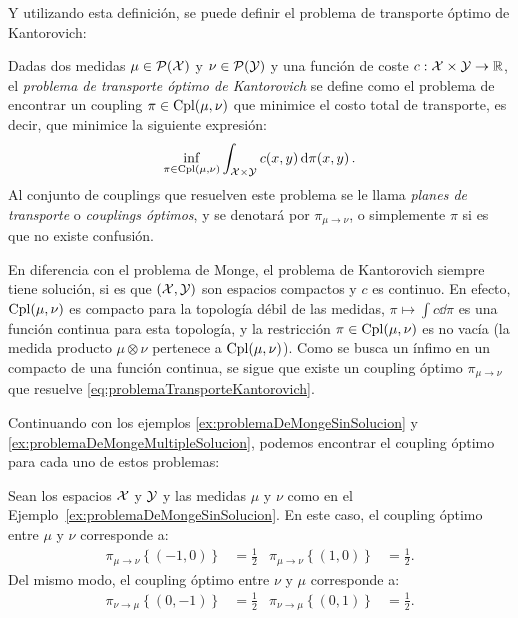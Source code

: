{{	  Y utilizando esta definición, se puede definir el problema de transporte óptimo de Kantorovich:
	  \begin{definition}
		  Dadas dos medidas $\mu \in \ProbSpace[\cX]$ y $\nu \in \ProbSpace[\cY]$ y una función de coste $c: \cX \times \cY \to \R$, el \emph{problema de transporte óptimo de Kantorovich} se define como el problema de encontrar un coupling $\pi \in \Cpl(\mu, \nu)$ que minimice el costo total de transporte, es decir, que minimice la siguiente expresión:
		  \begin{equation}
			  \label{eq:problemaTransporteKantorovich}
			  \inf_{\pi \in \Cpl(\mu, \nu)} \int_{\cX \times \cY} c(x, y) \dpi[x, y] .
		  \end{equation}
		  Al conjunto de couplings que resuelven este problema se le llama \emph{planes de transporte} o \emph{couplings óptimos}, y se denotará por $\pi_{\mu \to \nu}$, o simplemente $\pi$ si es que no existe confusión.
	  \end{definition}


	  En diferencia con el problema de Monge, el problema de Kantorovich siempre tiene solución, si es que $(\cX, \cY)$ son espacios compactos y $c$ es continuo. En efecto, $\Cpl(\mu, \nu)$ es compacto para la topología débil de las medidas, $\pi \mapsto \int c\dd{\pi}$ es una función continua para esta topología, y la restricción $\pi\in\Cpl(\mu, \nu)$ es no vacía (la medida producto $\mu \otimes \nu$ pertenece a $\Cpl(\mu, \nu)$). Como se busca un ínfimo en un compacto de una función continua, se sigue que existe un coupling óptimo $\pi_{\mu \to \nu}$ que resuelve \eqref{eq:problemaTransporteKantorovich}.


	  Continuando con los ejemplos \ref*{ex:problemaDeMongeSinSolucion} y \ref*{ex:problemaDeMongeMultipleSolucion}, podemos encontrar el coupling óptimo para cada uno de estos problemas:

	  \begin{example}
		  Sean los espacios $\cX$ y $\cY$ y las medidas $\mu$ y $\nu$ como en el Ejemplo~\ref*{ex:problemaDeMongeSinSolucion}. En este caso, el coupling óptimo entre $\mu$ y $\nu$ corresponde a:
		  \begin{align*}
			  \pi_{\mu \to \nu}\left\{ (-1, 0) \right\} & = \frac{1}{2} & \pi_{\mu \to \nu}\left\{ (1, 0) \right\} & = \frac{1}{2}.
		  \end{align*}
		  Del mismo modo, el coupling óptimo entre $\nu$ y $\mu$ corresponde a:
		  \begin{align*}
			  \pi_{\nu \to \mu}\left\{ (0, -1) \right\} & = \frac{1}{2} & \pi_{\nu \to \mu}\left\{ (0, 1) \right\} & = \frac{1}{2}.
		  \end{align*}


\end{example}}}
